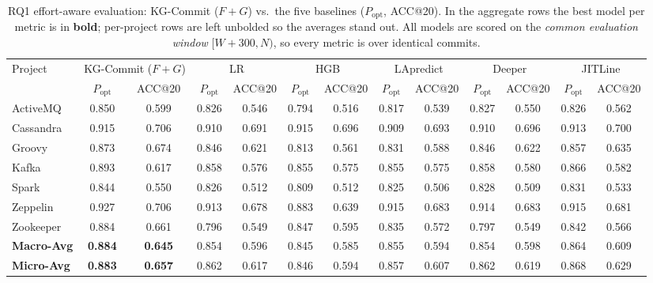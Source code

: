 \documentclass[final,5p,times,twocolumn]{elsarticle}
\theoremstyle{plain}
\begin{document}
\begin{table}[t]\centering
\scriptsize\setlength{\tabcolsep}{3pt}
\caption{RQ1 effort-aware evaluation: KG-Commit ($F{+}G$) vs.\ the five baselines ($P_{\mathrm{opt}}$, ACC@20). In the aggregate rows the best model per metric is in \textbf{bold}; per-project rows are left unbolded so the averages stand out. All models are scored on the \emph{common evaluation window} $[W{+}300,N)$, so every metric is over identical commits.}
\label{tab:rq1_effort_g50}
\begin{tabular}{lcccccccccccc}
\toprule
\multirow{2}{*}{Project} & \multicolumn{2}{c}{KG-Commit ($F{+}G$)} & \multicolumn{2}{c}{LR} & \multicolumn{2}{c}{HGB} & \multicolumn{2}{c}{LApredict} & \multicolumn{2}{c}{Deeper} & \multicolumn{2}{c}{JITLine} \\
\cmidrule(lr){2-3} \cmidrule(lr){4-5} \cmidrule(lr){6-7} \cmidrule(lr){8-9} \cmidrule(lr){10-11} \cmidrule(lr){12-13}
 & $P_{\mathrm{opt}}$ & ACC@20 & $P_{\mathrm{opt}}$ & ACC@20 & $P_{\mathrm{opt}}$ & ACC@20 & $P_{\mathrm{opt}}$ & ACC@20 & $P_{\mathrm{opt}}$ & ACC@20 & $P_{\mathrm{opt}}$ & ACC@20 \\ \midrule
ActiveMQ & 0.850 & 0.599 & 0.826 & 0.546 & 0.794 & 0.516 & 0.817 & 0.539 & 0.827 & 0.550 & 0.826 & 0.562 \\
Cassandra & 0.915 & 0.706 & 0.910 & 0.691 & 0.915 & 0.696 & 0.909 & 0.693 & 0.910 & 0.696 & 0.913 & 0.700 \\
Groovy & 0.873 & 0.674 & 0.846 & 0.621 & 0.813 & 0.561 & 0.831 & 0.588 & 0.846 & 0.622 & 0.857 & 0.635 \\
Kafka & 0.893 & 0.617 & 0.858 & 0.576 & 0.855 & 0.575 & 0.855 & 0.575 & 0.858 & 0.580 & 0.866 & 0.582 \\
Spark & 0.844 & 0.550 & 0.826 & 0.512 & 0.809 & 0.512 & 0.825 & 0.506 & 0.828 & 0.509 & 0.831 & 0.533 \\
Zeppelin & 0.927 & 0.706 & 0.913 & 0.678 & 0.883 & 0.639 & 0.915 & 0.683 & 0.914 & 0.683 & 0.915 & 0.681 \\
Zookeeper & 0.884 & 0.661 & 0.796 & 0.549 & 0.847 & 0.595 & 0.835 & 0.572 & 0.797 & 0.549 & 0.842 & 0.566 \\
\midrule \textbf{Macro-Avg} & \textbf{0.884} & \textbf{0.645} & 0.854 & 0.596 & 0.845 & 0.585 & 0.855 & 0.594 & 0.854 & 0.598 & 0.864 & 0.609 \\
\midrule \textbf{Micro-Avg} & \textbf{0.883} & \textbf{0.657} & 0.862 & 0.617 & 0.846 & 0.594 & 0.857 & 0.607 & 0.862 & 0.619 & 0.868 & 0.629 \\
\bottomrule
\end{tabular}
\end{table}
\end{document}
